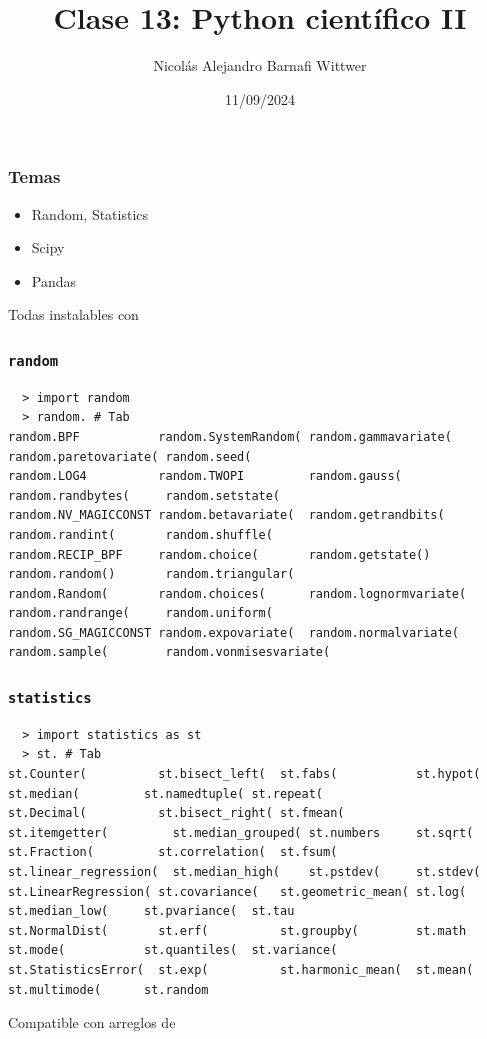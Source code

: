 \documentclass[14pt,aspectratio=169,xcolor=dvipsnames]{beamer}
\title[short title]{Clase 13: Python científico II}
\subtitle{}
\author[NA Barnafi] {Nicolás Alejandro Barnafi Wittwer}
\institute[UC|CMM] 
{
    Pontificia Universidad Católica de Chile \\
    Centro de Modelamiento Matemático
}
\date{11/09/2024}
\begin{document}
\begin{frame}
    \maketitle
\end{frame}
\begin{frame}\frametitle{Temas}
    \begin{itemize}
        \item Random, Statistics
        \item Scipy
        \item Pandas
    \end{itemize}

    \vspace{1cm}
    Todas instalables con 
\end{frame}
\begin{frame}[fragile]\frametitle{\texttt{random}}
    \begin{verbatim}
  > import random
  > random. # Tab
random.BPF           random.SystemRandom( random.gammavariate(   random.paretovariate( random.seed(           
random.LOG4          random.TWOPI         random.gauss(          random.randbytes(     random.setstate(         
random.NV_MAGICCONST random.betavariate(  random.getrandbits(    random.randint(       random.shuffle(          
random.RECIP_BPF     random.choice(       random.getstate()      random.random()       random.triangular(       
random.Random(       random.choices(      random.lognormvariate( random.randrange(     random.uniform(          
random.SG_MAGICCONST random.expovariate(  random.normalvariate(  random.sample(        random.vonmisesvariate( 
    \end{verbatim}
    
\end{frame}
\begin{frame}[fragile]\frametitle{\texttt{statistics}}
    \begin{verbatim}
  > import statistics as st
  > st. # Tab
st.Counter(          st.bisect_left(  st.fabs(           st.hypot(              st.median(         st.namedtuple( st.repeat(
st.Decimal(          st.bisect_right( st.fmean(          st.itemgetter(         st.median_grouped( st.numbers     st.sqrt(
st.Fraction(         st.correlation(  st.fsum(           st.linear_regression(  st.median_high(    st.pstdev(     st.stdev(
st.LinearRegression( st.covariance(   st.geometric_mean( st.log(                st.median_low(     st.pvariance(  st.tau
st.NormalDist(       st.erf(          st.groupby(        st.math                st.mode(           st.quantiles(  st.variance(
st.StatisticsError(  st.exp(          st.harmonic_mean(  st.mean(               st.multimode(      st.random      
    \end{verbatim}
    Compatible con arreglos de  
\end{frame}
\end{document}
